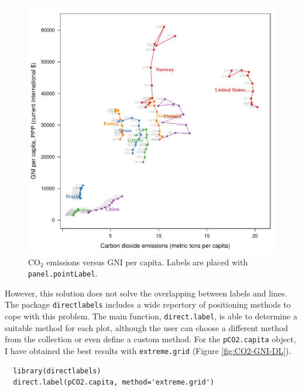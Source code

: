 \documentclass[smallroyalvopaper]{memoir}
\begin{document}
\begin{figure}[htbp]
\centering
\includegraphics[width=.9\linewidth]{figs/CO2_capita.pdf}
\caption{\(\mathrm{CO_2}\) emissions versus GNI per capita. Labels are placed with \texttt{panel.pointLabel}. \label{fig:CO2-GNI-glayer}}
\end{figure}

However, this solution does not solve the overlapping between labels
and lines. The package \texttt{directlabels} \cite{Hocking2013} includes a
wide repertory of positioning methods to cope with this problem. The
main function, \texttt{direct.label}, is able to determine a suitable method
for each plot, although the user can choose a different method from
the collection or even define a custom method. For the \texttt{pCO2.capita}
object, I have obtained the best results with \texttt{extreme.grid} (Figure
\ref{fig:CO2-GNI-DL}).


\lstset{language=r,label= ,caption= ,captionpos=b,numbers=none}
\begin{lstlisting}
  library(directlabels)
  direct.label(pCO2.capita, method='extreme.grid')
\end{lstlisting}
\end{document}
